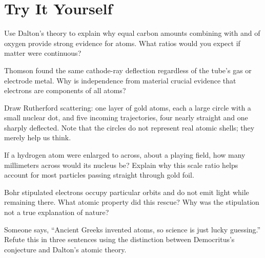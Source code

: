 \section*{Try It Yourself}

\begin{sikaoti}
\item Use Dalton's theory to explain why equal carbon amounts combining with  and  of oxygen provide strong evidence for atoms. What ratios would you expect if matter were continuous?
\item Thomson found the same cathode-ray deflection regardless of the tube's gas or electrode metal. Why is independence from material crucial evidence that electrons are components of all atoms?
\item Draw Rutherford scattering: one layer of gold atoms, each a large circle with a small nuclear dot, and five incoming \chem{\alpha} trajectories, four nearly straight and one sharply deflected. Note that the circles do not represent real atomic shells; they merely help us think.
\item If a hydrogen atom were enlarged to  across, about a playing field, how many millimeters across would its nucleus be? Explain why this scale ratio helps account for most particles passing straight through gold foil.
\item Bohr stipulated electrons occupy particular orbits and do not emit light while remaining there. What atomic property did this rescue? Why was the stipulation not a true explanation of nature?
\item Someone says, ``Ancient Greeks invented atoms, so science is just lucky guessing.'' Refute this in three sentences using the distinction between Democritus's conjecture and Dalton's atomic theory.
\end{sikaoti}
